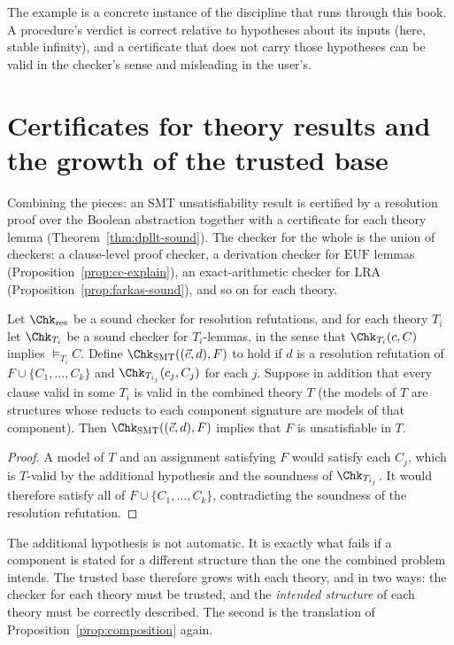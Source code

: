 The example is a concrete instance of the discipline that runs through this book. A procedure's verdict is correct relative to hypotheses about its inputs (here, stable infinity), and a certificate that does not carry those hypotheses can be valid in the checker's sense and misleading in the user's.

\section{Certificates for theory results and the growth of the trusted base}
\label{sec:smt-certificates}

Combining the pieces: an SMT unsatisfiability result is certified by a resolution proof over the Boolean abstraction together with a certificate for each theory lemma (Theorem~\ref{thm:dpllt-sound}). The checker for the whole is the union of checkers: a clause-level proof checker, a derivation checker for $\mathrm{EUF}$ lemmas (Proposition~\ref{prop:cc-explain}), an exact-arithmetic checker for $\mathrm{LRA}$ (Proposition~\ref{prop:farkas-sound}), and so on for each theory.

\begin{theorem}
\label{thm:smt-checker}
Let $\Chk_{\mathrm{res}}$ be a sound checker for resolution refutations, and for each theory $T_i$ let $\Chk_{T_i}$ be a sound checker for $T_i$-lemmas, in the sense that $\Chk_{T_i}(c,C)$ implies $\models_{T_i}C$. Define $\Chk_{\mathrm{SMT}}((\vec c,d),F)$ to hold if $d$ is a resolution refutation of $F\cup\{C_1,\dots,C_k\}$ and $\Chk_{T_{i_j}}(c_j,C_j)$ for each $j$. Suppose in addition that every clause valid in some $T_i$ is valid in the combined theory $T$ (the models of $T$ are structures whose reducts to each component signature are models of that component). Then $\Chk_{\mathrm{SMT}}((\vec c,d),F)$ implies that $F$ is unsatisfiable in $T$.
\end{theorem}

\begin{proof}
A model of $T$ and an assignment satisfying $F$ would satisfy each $C_j$, which is $T$-valid by the additional hypothesis and the soundness of $\Chk_{T_{i_j}}$. It would therefore satisfy all of $F\cup\{C_1,\dots,C_k\}$, contradicting the soundness of the resolution refutation.
\end{proof}

The additional hypothesis is not automatic. It is exactly what fails if a component is stated for a different structure than the one the combined problem intends. The trusted base therefore grows with each theory, and in two ways: the checker for each theory must be trusted, and the \emph{intended structure} of each theory must be correctly described. The second is the translation of Proposition~\ref{prop:composition} again.

